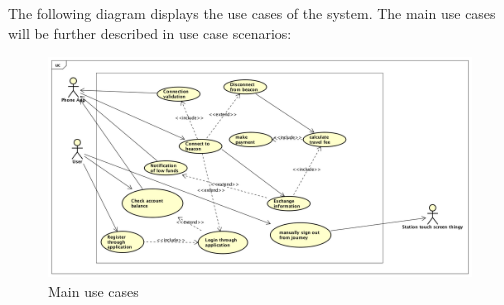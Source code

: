The following diagram displays the use cases of the system. The main use cases will be further described in use case scenarios:

\begin{figure}[H]
	\centering
	\includegraphics[width=500pt]{Pictures/main_use_cases.png}
	\caption{Main use cases}
	\label{fig:main_use_cases}
\end{figure}

